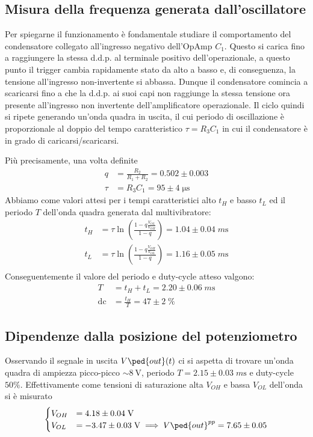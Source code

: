 \documentclass[10pt, a4paper, italian]{article}
\begin{document}
\subsection{Misura della frequenza generata dall'oscillatore}
Per spiegarne il funzionamento è fondamentale studiare il comportamento del
condensatore collegato all'ingresso negativo dell'OpAmp $C_1$. Questo si
carica fino a raggiungere la stessa d.d.p. al terminale positivo
dell'operazionale, a questo punto il trigger cambia rapidamente stato da alto
a basso e, di conseguenza, la tensione all'ingresso non-invertente si abbassa.
Dunque il condensatore comincia a scaricarsi fino a che la d.d.p. ai suoi capi
non raggiunge la stessa tensione ora presente all'ingresso non invertente
dell'amplificatore operazionale.
Il ciclo quindi si ripete generando un'onda quadra in uscita, il cui
periodo di oscillazione è proporzionale al doppio del tempo caratteristico
$\tau = R_3 C_1$ in cui il condensatore è in grado di caricarsi/scaricarsi.

Più precisamente, una volta definite
\begin{align*}
q &= \frac{R_2}{R_1 + R_2} = 0.502 \pm 0.003 \\
\tau &= R_3 C_1 = 95 \pm 4 \; \si{\micro\s}
\end{align*}
Abbiamo come valori attesi per i tempi caratteristici alto $t_H$ e basso
$t_L$ ed il periodo $T$ dell'onda quadra generata dal multivibratore:
\begin{align}
t_H &= \tau \ln\left(\frac{1 - q\frac{V_{OL}}{V_{OH}}}{1-q}\right) =
1.04 \pm 0.04 \; \si{m\s} \\
t_L &= \tau \ln\left(\frac{1 - q\frac{V_{OH}}{V_{OL}}}{1-q}\right) =
1.16 \pm 0.05 \; \si{m\s} \\
\end{align}
Conseguentemente il valore del periodo e duty-cycle atteso valgono:
\begin{align}
T &= t_H + t_L = 2.20 \pm 0.06 \; \si{m\s} \\
\mathrm{dc} &= \frac{t_H}{T} = 47 \pm 2 \; \%
\end{align}

\subsection{Dipendenze dalla posizione del potenziometro}
Osservando il segnale in uscita $V\ped{out} (t)$ ci si aspetta di trovare
un'onda quadra di ampiezza picco-picco $\sim \SI{8}{\V}$, periodo
$T = 2.15 \pm 0.03 \; \si{m\s}$ e duty-cycle $50 \%$. Effettivamente come
tensioni di saturazione alta $V_{OH}$ e bassa $V_{OL}$ dell'onda si è misurato
\begin{align*}
\begin{cases}
V_{OH} &= 4.18 \pm 0.04 \; \si{\V} \\
V_{OL} &= -3.47 \pm 0.03 \; \si{\V}  \implies V\ped{out}^{pp} = 7.65 \pm 0.05
\end{cases}
\end{align*}
\end{document}
